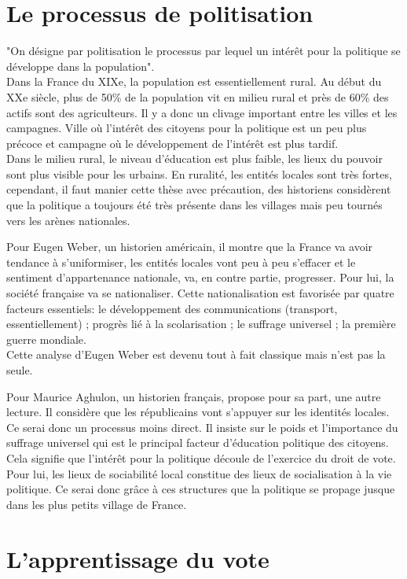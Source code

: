 \documentclass[10pt, a4paper, openany]{book}
\begin{document}
\section{Le processus de politisation}

"On désigne par politisation le processus par lequel un intérêt pour la politique se développe dans la population". \\
Dans la France du XIXe, la population est essentiellement rural. Au début du XXe siècle, plus de 50\% de la population vit en milieu rural et près de 60\% des actifs sont des agriculteurs. Il y a donc un clivage important entre les villes et les campagnes. Ville où l'intérêt des citoyens pour la politique est un peu plus précoce et campagne où le développement de l'intérêt est plus tardif. \\
Dans le milieu rural, le niveau d'éducation est plus faible, les lieux du pouvoir sont plus visible pour les urbains. En ruralité, les entités locales sont très fortes, cependant, il faut manier cette thèse avec précaution, des historiens considèrent que la politique a toujours été très présente dans les villages mais peu tournés vers les arènes nationales. 


Pour Eugen Weber, un historien américain, il montre que la France va avoir tendance à s'uniformiser, les entités locales vont peu à peu s'effacer et le sentiment d'appartenance nationale, va, en contre partie, progresser. Pour lui, la société française va se nationaliser. Cette nationalisation est favorisée par quatre facteurs essentiels: le développement des communications (transport, essentiellement) ; progrès lié à la scolarisation ; le suffrage universel ; la première guerre mondiale. \\
Cette analyse d'Eugen Weber est devenu tout à fait classique mais n'est pas la seule.


Pour Maurice Aghulon, un historien français, propose pour sa part, une autre lecture. Il considère que les républicains vont s'appuyer sur les identités locales. Ce serai donc un processus moins direct. Il insiste sur le poids et l'importance du suffrage universel qui est le principal facteur d'éducation politique des citoyens. Cela signifie que l'intérêt pour la politique découle de l'exercice du droit de vote. Pour lui, les lieux de sociabilité local constitue des lieux de socialisation à la vie politique. Ce serai donc grâce à ces structures que la politique se propage jusque dans les plus petits village de France. 


\section{L'apprentissage du vote}
\end{document}
